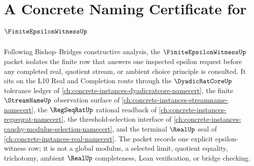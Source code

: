 \chapter{A Concrete Naming Certificate for $\FiniteEpsilonWitnessUp$}
\label{ch:concrete-instances-finite-epsilon-witness-namecert}

Following Bishop--Bridges constructive analysis, the $\FiniteEpsilonWitnessUp$ packet isolates the finite row that answers one inspected epsilon request before any completed real, quotient stream, or ambient choice principle is consulted. It sits on the L10 Real and Completion route through the $\DyadicRatCoreUp$ tolerance ledger of \autoref{ch:concrete-instances-dyadicratcore-namecert}, the finite $\StreamNameUp$ observation surface of \autoref{ch:concrete-instances-streamname-namecert}, the $\RegSeqRatUp$ rational readback of \autoref{ch:concrete-instances-regseqrat-namecert}, the threshold-selection interface of \autoref{ch:concrete-instances-cauchy-modulus-selection-namecert}, and the terminal $\RealUp$ seal of \autoref{ch:concrete-instances-real-namecert}. The packet records one explicit epsilon-witness row; it is not a global modulus, a selected limit, quotient equality, trichotomy, ambient $\RealUp$ completeness, Lean verification, or bridge checking.

